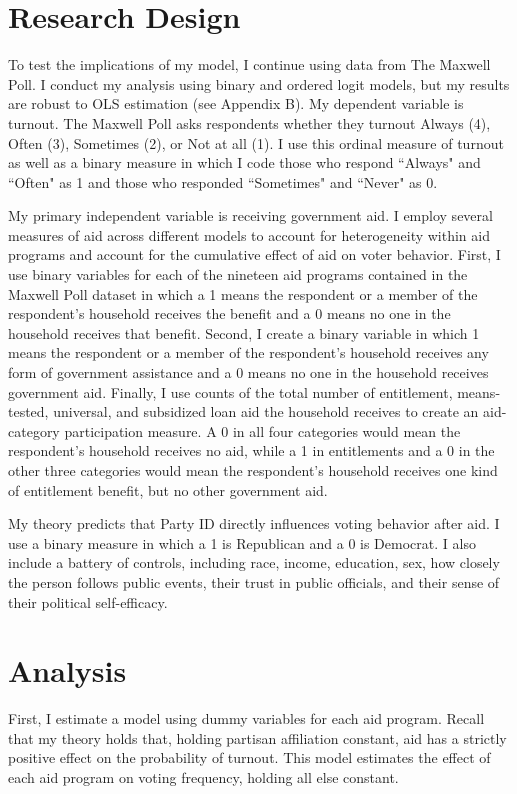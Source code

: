 \documentclass[12pt]{paper}
\begin{document}
\section{Research Design}

To test the implications of my model, I continue using data from The Maxwell Poll. I conduct my analysis using binary and ordered logit models, but my results are robust to OLS estimation (see Appendix B). My dependent variable is turnout. The Maxwell Poll asks respondents whether they turnout Always (4), Often (3), Sometimes (2), or Not at all (1). I use this ordinal measure of turnout as well as a binary measure in which I code those who respond ``Always" and ``Often" as 1 and those who responded ``Sometimes" and ``Never" as 0.

My primary independent variable is receiving government aid. I employ several measures of aid across different models to account for heterogeneity within aid programs and account for the cumulative effect of aid on voter behavior. First, I use binary variables for each of the nineteen aid programs contained in the Maxwell Poll dataset in which a 1 means the respondent or a member of the respondent’s household receives the benefit and a 0 means no one in the household receives that benefit. Second, I create a binary variable in which 1 means the respondent or a member of the respondent’s household receives any form of government assistance and a 0 means no one in the household receives government aid. Finally, I use counts of the total number of entitlement, means-tested, universal, and subsidized loan aid the household receives to create an aid-category participation measure. A 0 in all four categories would mean the respondent’s household receives no aid, while a 1 in entitlements and a 0 in the other three categories would mean the respondent’s household receives one kind of entitlement benefit, but no other government aid.

My theory predicts that Party ID directly influences voting behavior after aid. I use a binary measure in which a 1 is Republican and a 0 is Democrat. I also include a battery of controls, including race, income, education, sex, how closely the person follows public events, their trust in public officials, and their sense of their political self-efficacy.

\section{Analysis}
First, I estimate a model using dummy variables for each aid program. Recall that my theory holds that, holding partisan affiliation constant, aid has a strictly positive effect on the probability of turnout. This model estimates the effect of each aid program on voting frequency, holding all else constant.
\end{document}
